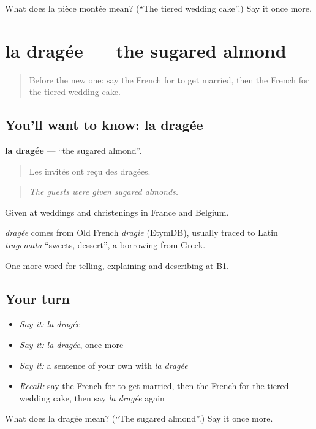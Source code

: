 \begin{tcolorbox}[breakable,colback=teal!4,colframe=teal!35!black,title={Before you move on}]
What does la pièce montée mean? (\textquotedblleft{}The tiered wedding cake\textquotedblright{}.) Say it once more.
\end{tcolorbox}
\section[la dragée]{la dragée — the sugared almond}

\label{lesson:FR-C311-dragee}



\begin{quote}
Before the new one: say the French for to get married, then the French for the tiered wedding cake.
\end{quote}

\subsection*{You'll want to know: la dragée}
\textbf{la dragée} — \textquotedblleft{}the sugared almond\textquotedblright{}.

\begin{quote}
Les invités ont reçu des dragées.
\end{quote}

\begin{quote}
\emph{The guests were given sugared almonds.}
\end{quote}

Given at weddings and christenings in France and Belgium.

\begin{cousinweb}
\emph{dragée} comes from Old French \emph{dragie} (EtymDB), usually traced to Latin \emph{tragēmata} \textquotedblleft{}sweets, dessert\textquotedblright{}, a borrowing from Greek.
\end{cousinweb}

\begin{grammarlens}[title={What you've built}]
One more word for telling, explaining and describing at B1.
\end{grammarlens}

\subsection*{Your turn}
\begin{itemize}
\raggedright
  \item \emph{Say it:} \emph{la dragée}
  \item \emph{Say it:} \emph{la dragée}, once more
  \item \emph{Say it:} a sentence of your own with \emph{la dragée}
  \item \emph{Recall:} say the French for to get married, then the French for the tiered wedding cake, then say \emph{la dragée} again
\end{itemize}

\begin{tcolorbox}[breakable,colback=teal!4,colframe=teal!35!black,title={Before you move on}]
What does la dragée mean? (\textquotedblleft{}The sugared almond\textquotedblright{}.) Say it once more.
\end{tcolorbox}
